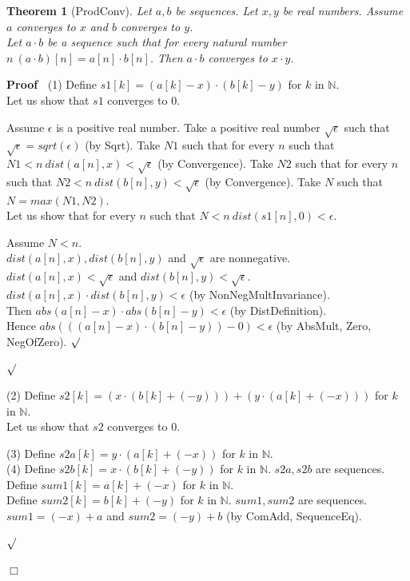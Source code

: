 \documentclass{article}
\newenvironment{forthel}{\begin{leftbar}}{\end{leftbar}}
\newenvironment{proof}{\noindent\textbf{Proof\ }}{\hspace*{\fill}$\Box$\medskip}
\newenvironment{subproof}{\begin{list}{}{}
		\item[\text{Proof}]}{\hfill $\surd$ \end{list}}
\newtheorem{theorem}{Theorem}
\newcommand{\NN}{\mathbb{N}}
\newcommand{\cdotone}{\cdot}
\newcommand{\plustwo}{+}
\newcommand{\rooteps}{\sqrt{\epsilon}}
\begin{document}
\begin{forthel}
	\begin{theorem}[ProdConv]
	Let $a,b$ be sequences. Let $x,y$ be real numbers. Assume $a$ converges to $x$ and $b$ converges to $y$.
	\\Let $a \cdotone b$ be a sequence such that for every natural number $n \ (a \cdotone b)[n] = a[n] \cdot b[n]$.
	Then $a \cdotone b$ converges to $x \cdot y$.
	\end{theorem}
	\begin{proof}
	(1) Define $s1[k] = (a[k] - x) \cdot (b[k] - y)$ for $k$ in $\NN$.
	\\Let us show that $s1$ converges to $0$. 
	\begin{subproof}
    Assume $\epsilon$ is a positive real number. 
    Take a positive real number $\rooteps$ such that $\rooteps = sqrt(\epsilon)$ (by Sqrt).
    Take $N1$ such that for every $n$ such that $N1 < n \ dist(a[n],x) < \rooteps$ (by Convergence).
    Take $N2$ such that for every $n$ such that $N2 < n \ dist(b[n],y) < \rooteps$ (by Convergence).
    Take $N$ such that $N = max(N1,N2)$.
    \\Let us show that for every $n$ such that $N < n \ dist(s1[n],0) < \epsilon$.
    \begin{subproof}
    Assume $N < n$.
    \\$dist(a[n],x), dist(b[n],y)$ and $\rooteps$ are nonnegative.
    \\$dist(a[n],x) < \rooteps$ and $dist(b[n],y) < \rooteps$.
    \\$dist(a[n],x) \cdot dist(b[n],y) < \epsilon$ (by NonNegMultInvariance).
    \\Then $abs(a[n] - x) \cdot abs(b[n] - y) < \epsilon$ (by DistDefinition).
    \\Hence $abs(((a[n] - x) \cdot (b[n] - y)) - 0) < \epsilon$ (by AbsMult,  Zero, NegOfZero).
    \end{subproof}
	\end{subproof}
	(2) Define $s2[k] = (x \cdot (b[k] + (-y))) + (y \cdot (a[k] + (-x)))$ for $k$ in $\NN$.
	\\Let us show that $s2$ converges to $0$.
	\begin{subproof}
	(3) Define $s2a[k] = y \cdot (a[k] + (-x))$ for $k$ in $\NN$.
	\\(4) Define $s2b[k] = x \cdot (b[k] + (-y))$ for $k$ in $\NN$.
	$s2a, s2b$ are sequences.
	Define $sum1[k] = a[k] + (-x)$ for $k$ in $\NN$.
	\\Define $sum2[k] = b[k] + (-y)$ for $k$ in $\NN$.
	$sum1, sum2$ are sequences.
	\\$sum1 = (-x) \plustwo a$ and $sum2 = (-y) \plustwo b$ (by ComAdd, SequenceEq).

\end{subproof}
\end{proof}
\end{forthel}
\end{document}
